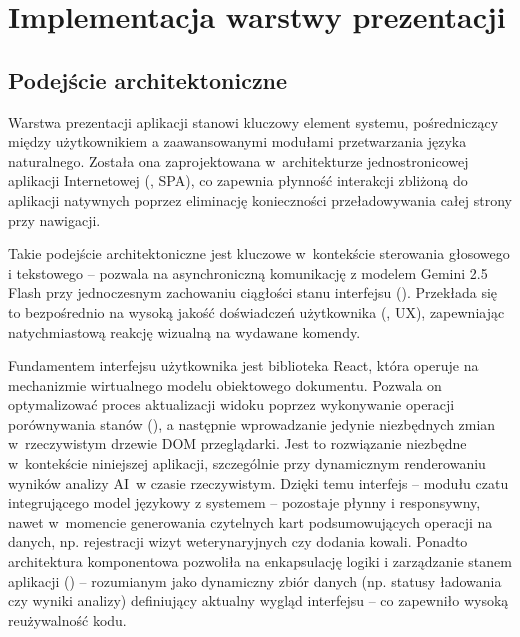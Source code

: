 \chapter{Implementacja warstwy prezentacji}
\label{chapters:04-front}

\section{Podejście architektoniczne}

Warstwa prezentacji aplikacji  stanowi kluczowy element systemu, pośredniczący między użytkownikiem a zaawansowanymi modułami przetwarzania języka naturalnego. Została ona zaprojektowana w~architekturze jednostronicowej aplikacji Internetowej (, SPA), co zapewnia płynność interakcji zbliżoną do aplikacji natywnych poprzez eliminację konieczności przeładowywania całej strony przy nawigacji. 

Takie podejście architektoniczne jest kluczowe w~kontekście sterowania głosowego i tekstowego -- pozwala na asynchroniczną komunikację z modelem Gemini 2.5 Flash przy jednoczesnym zachowaniu ciągłości stanu interfejsu (). Przekłada się to bezpośrednio na wysoką jakość doświadczeń użytkownika (, UX), zapewniając natychmiastową reakcję wizualną na wydawane komendy.

Fundamentem interfejsu użytkownika jest biblioteka React, która operuje na mechanizmie wirtualnego modelu
obiektowego dokumentu. Pozwala on optymalizować proces aktualizacji widoku poprzez wykonywanie operacji porównywania stanów (), a następnie wprowadzanie jedynie niezbędnych zmian w~rzeczywistym drzewie DOM przeglądarki. Jest to rozwiązanie niezbędne w~kontekście niniejszej aplikacji, szczególnie przy dynamicznym renderowaniu wyników analizy AI~w czasie rzeczywistym. Dzięki temu interfejs  -- modułu czatu integrującego model językowy z systemem -- pozostaje płynny i responsywny, nawet w~momencie generowania czytelnych kart podsumowujących operacji na danych, np. rejestracji wizyt weterynaryjnych czy dodania kowali. Ponadto architektura komponentowa pozwoliła na enkapsulację logiki i zarządzanie stanem aplikacji () -- rozumianym jako dynamiczny zbiór danych (np. statusy ładowania czy wyniki analizy) definiujący aktualny wygląd interfejsu -- co zapewniło wysoką reużywalność kodu.

